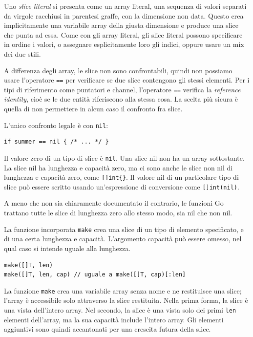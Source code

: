Uno \textit{slice literal} si presenta come un array literal, una sequenza di valori separati da virgole racchiusi in parentesi graffe, con la dimensione non data.
Questo crea implicitamente una variabile array della giusta dimensione e produce una slice che punta ad essa.
Come con gli array literal, gli slice literal possono specificare in ordine i valori, o assegnare esplicitamente loro gli indici, oppure usare un mix dei due stili.

A differenza degli array, le slice non sono confrontabili, quindi non possiamo usare l'operatore \verb|==| per verificare se due slice contengono gli stessi elementi.
Per i tipi di riferimento come puntatori e channel, l'operatore \verb|==| verifica la \textit{reference identity}, cioè se le due entità riferiscono alla stessa cosa.
La scelta più sicura è quella di non permettere in alcun caso il confronto fra slice.

L'unico confronto legale è con \verb|nil|:
\begin{lstlisting}[frame=single, label={lst:lstlisting3-2.6}]
if summer == nil { /* ... */ }
\end{lstlisting}
Il valore zero di un tipo di slice è \verb|nil|.
Una slice nil non ha un array sottostante.
La slice nil ha lunghezza e capacità zero, ma ci sono anche le slice non nil di lunghezza e capacità zero, come \verb|[]int{}|.
Il valore nil di un particolare tipo di slice può essere scritto usando un'espressione di conversione come \verb|[]int(nil)|.

A meno che non sia chiaramente documentato il contrario, le funzioni Go trattano tutte le slice di lunghezza zero allo stesso modo, sia nil che non nil.

La funzione incorporata \verb|make| crea una slice di un tipo di elemento specificato, e di una certa lunghezza e capacità.
L'argomento capacità può essere omesso, nel qual caso si intende uguale alla lunghezza.
\begin{lstlisting}[frame=single, label={lst:lstlisting3-2.7}]
make([]T, len)
make([]T, len, cap) // uguale a make([]T, cap)[:len]
\end{lstlisting}
La funzione \verb|make| crea una variabile array senza nome e ne restituisce una slice;
l'array è accessibile solo attraverso la slice restituita.
Nella prima forma, la slice è una vista dell'intero array.
Nel secondo, la slice è una vista solo dei primi \verb|len| elementi dell'array, ma la sua capacità include l'intero array.
Gli elementi aggiuntivi sono quindi accantonati per una crescita futura della slice.


